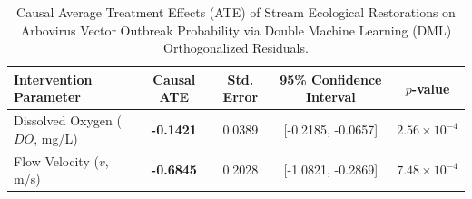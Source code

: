 \begin{table}[t]
\centering
\caption{Causal Average Treatment Effects (ATE) of Stream Ecological Restorations on Arbovirus Vector Outbreak Probability via Double Machine Learning (DML) Orthogonalized Residuals.}
\label{tab:dml_causal_ate}
\begin{tabular}{lcccc}
\toprule
\textbf{Intervention Parameter} & \textbf{Causal ATE} & \textbf{Std. Error} & \textbf{95\% Confidence Interval} & \textbf{$p$-value} \\
\midrule
Dissolved Oxygen ($DO$, mg/L)   & \textbf{-0.1421} & 0.0389 & [-0.2185, -0.0657] & $2.56 \times 10^{-4}$ \\
Flow Velocity ($v$, m/s)        & \textbf{-0.6845} & 0.2028 & [-1.0821, -0.2869] & $7.48 \times 10^{-4}$ \\
\bottomrule
\end{tabular}
\end{table}
